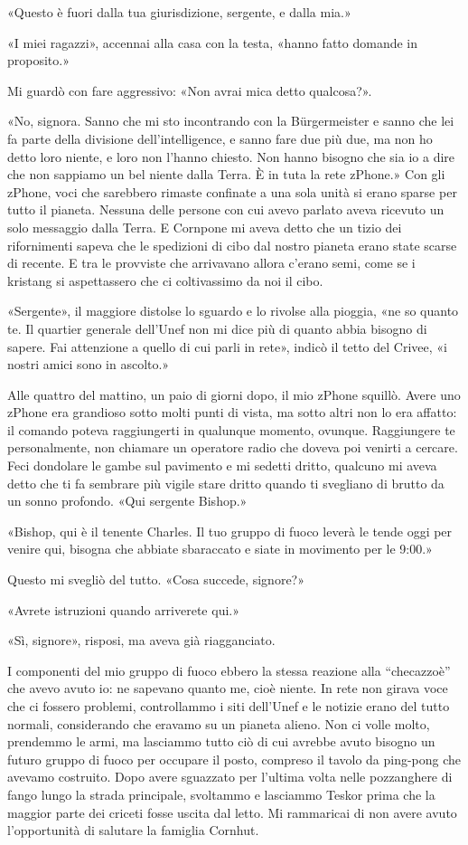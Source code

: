 «Questo è fuori dalla tua giurisdizione, sergente, e dalla mia.»

«I miei ragazzi», accennai alla casa con la testa, «hanno fatto domande
in proposito.»

Mi guardò con fare aggressivo: «Non avrai mica detto qualcosa?».

«No, signora. Sanno che mi sto incontrando con la Bürgermeister e sanno
che lei fa parte della divisione dell'intelligence, e sanno fare due più
due, ma non ho detto loro niente, e loro non l'hanno chiesto. Non hanno
bisogno che sia io a dire che non sappiamo un bel niente dalla Terra. È
in tuta la rete zPhone.» Con gli zPhone, voci che sarebbero rimaste
confinate a una sola unità si erano sparse per tutto il pianeta. Nessuna
delle persone con cui avevo parlato aveva ricevuto un solo messaggio
dalla Terra. E Cornpone mi aveva detto che un tizio dei rifornimenti
sapeva che le spedizioni di cibo dal nostro pianeta erano state scarse
di recente. E tra le provviste che arrivavano allora c'erano semi, come
se i kristang si aspettassero che ci coltivassimo da noi il cibo.

«Sergente», il maggiore distolse lo sguardo e lo rivolse alla pioggia,
«ne so quanto te. Il quartier generale dell'Unef non mi dice più di
quanto abbia bisogno di sapere. Fai attenzione a quello di cui parli in
rete», indicò il tetto del Crivee, «i nostri amici sono in ascolto.»

\hfill\break

Alle quattro del mattino, un paio di giorni dopo, il mio zPhone squillò.
Avere uno zPhone era grandioso sotto molti punti di vista, ma sotto
altri non lo era affatto: il comando poteva raggiungerti in qualunque
momento, ovunque. Raggiungere te personalmente, non chiamare un
operatore radio che doveva poi venirti a cercare. Feci dondolare le
gambe sul pavimento e mi sedetti dritto, qualcuno mi aveva detto che ti
fa sembrare più vigile stare dritto quando ti svegliano di brutto da un
sonno profondo. «Qui sergente Bishop.»

«Bishop, qui è il tenente Charles. Il tuo gruppo di fuoco leverà le
tende oggi per venire qui, bisogna che abbiate sbaraccato e siate in
movimento per le 9:00.»

Questo mi svegliò del tutto. «Cosa succede, signore?»

«Avrete istruzioni quando arriverete qui.»

«Sì, signore», risposi, ma aveva già riagganciato.

I componenti del mio gruppo di fuoco ebbero la stessa reazione alla
``checazzoè'' che avevo avuto io: ne sapevano quanto me, cioè niente. In
rete non girava voce che ci fossero problemi, controllammo i siti
dell'Unef e le notizie erano del tutto normali, considerando che eravamo
su un pianeta alieno. Non ci volle molto, prendemmo le armi, ma
lasciammo tutto ciò di cui avrebbe avuto bisogno un futuro gruppo di
fuoco per occupare il posto, compreso il tavolo da ping-pong che avevamo
costruito. Dopo avere sguazzato per l'ultima volta nelle pozzanghere di
fango lungo la strada principale, svoltammo e lasciammo Teskor prima che
la maggior parte dei criceti fosse uscita dal letto. Mi rammaricai di
non avere avuto l'opportunità di salutare la famiglia Cornhut.

